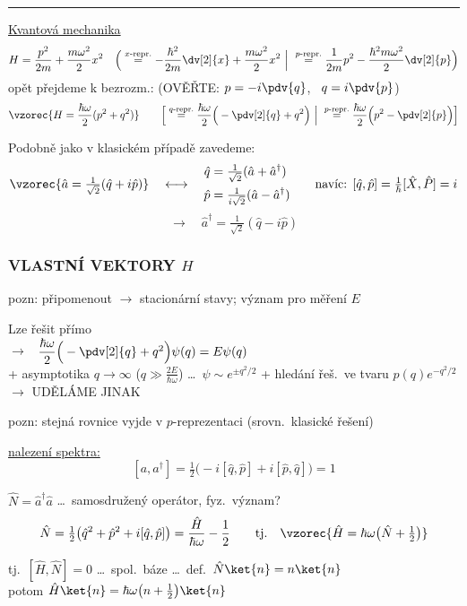 \noindent\rule{\linewidth}{0.3pt}

\underline{Kvantová mechanika}
\[
  H = \frac{p^2}{2m} + \frac{m\omega^2}{2}x^2
  \quad\Big(\overset{x\text{-repr.}}{=} -\frac{\hbar^2}{2m}\dv[2]{x} + \frac{m\omega^2}{2}x^2
  \ \Big|\ \overset{p\text{-repr.}}{=} \frac{1}{2m}p^2 - \frac{\hbar^2m\omega^2}{2}\dv[2]{p}\Big)
\]
opět přejdeme k bezrozm.: \quad (OVĚŘTE: $p = -i\pdv{q}$, \ $q = i\pdv{p}$)
\[
  \vzorec{H = \frac{\hbar\omega}{2}(p^2 + q^2)}
  \qquad
  \Big[\overset{q\text{-repr.}}{=} \frac{\hbar\omega}{2}\Big(-\pdv[2]{q} + q^2\Big)
  \ \Big|\ \overset{p\text{-repr.}}{=} \frac{\hbar\omega}{2}\Big(p^2 - \pdv[2]{p}\Big)\Big]
\]

Podobně jako v klasickém případě zavedeme:
\[
  \vzorec{\hat a = \tfrac{1}{\sqrt2}(\hat q + i\hat p)}
  \quad\longleftrightarrow\quad
  \begin{aligned}
    \hat q &= \tfrac{1}{\sqrt2}(\hat a + \hat a^\dagger) \\
    \hat p &= \tfrac{1}{i\sqrt2}(\hat a - \hat a^\dagger)
  \end{aligned}
  \qquad\text{navíc: } [\hat q,\hat p] = \tfrac{1}{\hbar}[\hat X,\hat P] = i
\]
\[ \to\quad \hat a^\dagger = \tfrac{1}{\sqrt2}(\hat q - i\hat p) \]

\subsubsection*{VLASTNÍ VEKTORY $H$}
pozn: připomenout $\to$ stacionární stavy; význam pro měření $E$

Lze řešit přímo  \\
\quad $\to$ \ $\dfrac{\hbar\omega}{2}\Big(-\pdv[2]{q} + q^2\Big)\psi(q) = E\psi(q)$ \\
\quad + asymptotika $q\to\infty$ ($q \gg \frac{2E}{\hbar\omega}$) \dots\ $\psi\sim e^{\pm q^2/2}$
+ hledání řeš.\ ve tvaru $p(q)e^{-q^2/2}$ \\
\hspace*{6cm} $\to$ UDĚLÁME JINAK

pozn: stejná rovnice vyjde v $p$-reprezentaci (srovn.\ klasické řešení)

\underline{nalezení spektra:}
\[
  [a,a^\dagger] = \tfrac12\big(-i[\hat q,\hat p] + i[\hat p,\hat q]\big) = 1
\]
\begin{definice}
$\hat N = \hat a^\dagger\hat a$ \quad \dots\ samosdružený operátor, fyz.\ význam?
\[
  \hat N = \tfrac12\big(\hat q^2 + \hat p^2 + i[\hat q,\hat p]\big) = \frac{\hat H}{\hbar\omega} - \frac12
  \qquad\text{tj.}\quad \vzorec{\hat H = \hbar\omega\big(\hat N + \tfrac12\big)}
\]
\end{definice}
tj.\ $[\hat H,\hat N] = 0$ \quad \dots\ spol.\ báze \quad \dots\ def.\ $\hat N\ket{n} = n\ket{n}$ \\
\quad potom \quad $\hat H\ket{n} = \hbar\omega\big(n + \frac12\big)\ket{n}$


